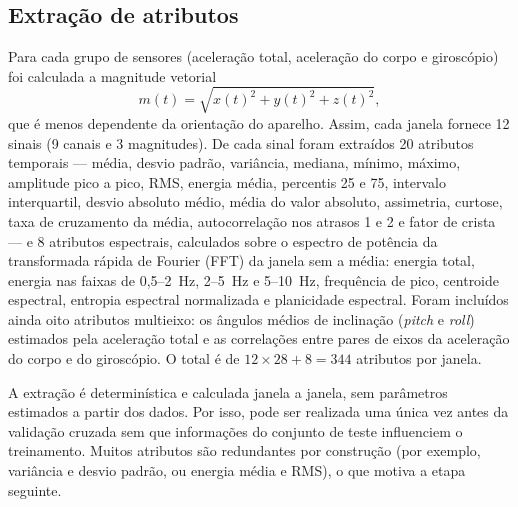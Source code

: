 \documentclass[conference]{IEEEtran}
\begin{document}
\subsection{Extração de atributos}
Para cada grupo de sensores (aceleração total, aceleração do corpo e giroscópio) foi calculada a magnitude vetorial
\begin{equation}
m(t)=\sqrt{x(t)^2+y(t)^2+z(t)^2},
\label{eq:magnitude}
\end{equation}
que é menos dependente da orientação do aparelho. Assim, cada janela fornece 12 sinais (9 canais e 3 magnitudes). De cada sinal foram extraídos 20 atributos temporais --- média, desvio padrão, variância, mediana, mínimo, máximo, amplitude pico a pico, RMS, energia média, percentis 25 e 75, intervalo interquartil, desvio absoluto médio, média do valor absoluto, assimetria, curtose, taxa de cruzamento da média, autocorrelação nos atrasos 1 e 2 e fator de crista --- e 8 atributos espectrais, calculados sobre o espectro de potência da transformada rápida de Fourier (FFT) da janela sem a média: energia total, energia nas faixas de 0,5--2~Hz, 2--5~Hz e 5--10~Hz, frequência de pico, centroide espectral, entropia espectral normalizada e planicidade espectral. Foram incluídos ainda oito atributos multieixo: os ângulos médios de inclinação (\textit{pitch} e \textit{roll}) estimados pela aceleração total e as correlações entre pares de eixos da aceleração do corpo e do giroscópio. O total é de $12\times28+8=344$ atributos por janela.

A extração é determinística e calculada janela a janela, sem parâmetros estimados a partir dos dados. Por isso, pode ser realizada uma única vez antes da validação cruzada sem que informações do conjunto de teste influenciem o treinamento. Muitos atributos são redundantes por construção (por exemplo, variância e desvio padrão, ou energia média e RMS), o que motiva a etapa seguinte.
\end{document}
